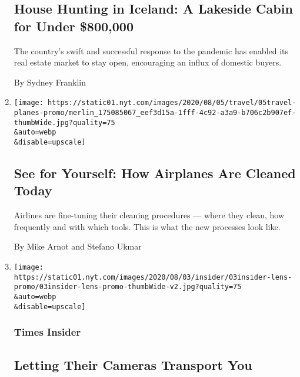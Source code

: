 \begin{enumerate}
  \hypertarget{house-hunting-in-iceland-a-lakeside-cabin-for-under-800000}{%
  \subsection{House Hunting in Iceland: A Lakeside Cabin for Under
  \$800,000}\label{house-hunting-in-iceland-a-lakeside-cabin-for-under-800000}}

  The country's swift and successful response to the pandemic has
  enabled its real estate market to stay open, encouraging an influx of
  domestic buyers.

  By Sydney Franklin
\item
  \href{/2020/08/05/travel/coronavirus-airplane-cleaning.html}{}

  \texttt{[image: https://static01.nyt.com/images/2020/08/05/travel/05travel-planes-promo/merlin\_175085067\_eef3d15a-1fff-4c92-a3a9-b706c2b907ef-thumbWide.jpg?quality=75\\\&auto=webp\\\&disable=upscale]}

  \hypertarget{see-for-yourself-how-airplanes-are-cleaned-today}{%
  \subsection{See for Yourself: How Airplanes Are Cleaned
  Today}\label{see-for-yourself-how-airplanes-are-cleaned-today}}

  Airlines are fine-tuning their cleaning procedures --- where they
  clean, how frequently and with which tools. This is what the new
  processes look like.

  By Mike Arnot and Stefano Ukmar
\item
  \href{/2020/08/03/insider/letting-their-cameras-transport-you.html}{}

  \texttt{[image: https://static01.nyt.com/images/2020/08/03/insider/03insider-lens-promo/03insider-lens-promo-thumbWide-v2.jpg?quality=75\\\&auto=webp\\\&disable=upscale]}

  \hypertarget{times-insider}{%
  \subsubsection{Times Insider}\label{times-insider}}

  \hypertarget{letting-their-cameras-transport-you}{%
  \subsection{Letting Their Cameras Transport
  You}\label{letting-their-cameras-transport-you}}


\end{enumerate}
